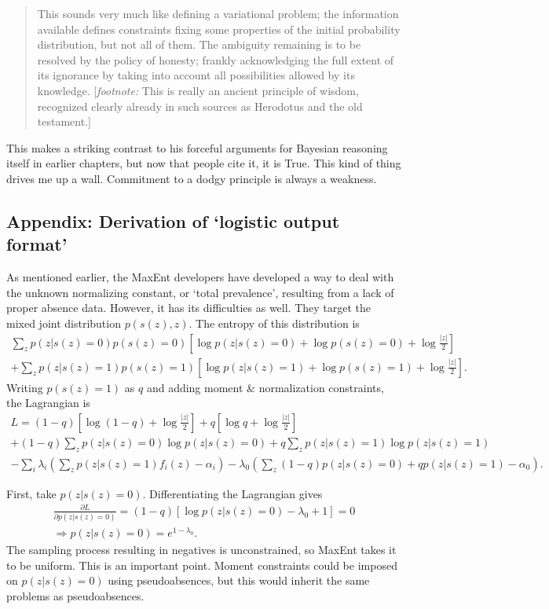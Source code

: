\begin{itemize}
\begin{quote}
    This sounds very much like defining a variational problem; the information available defines constraints fixing some properties of the initial probability distribution, but not all of them. The ambiguity remaining is to be resolved by the policy of honesty; frankly acknowledging the full extent of its ignorance by taking into account all possibilities allowed by its knowledge. [\emph{footnote:} This is really an ancient principle of wisdom, recognized clearly already in such sources as Herodotus and the old testament.]
\end{quote}
This makes a striking contrast to his forceful arguments for Bayesian reasoning itself in earlier chapters, but now that people cite it, it is True. This kind of thing drives me up a wall. Commitment to a dodgy principle is always a weakness.
\end{itemize}

\subsection{Appendix: Derivation of `logistic output format'}

As mentioned earlier, the MaxEnt developers have developed a way to deal with the unknown normalizing constant, or `total prevalence', resulting from a lack of proper absence data. However, it has its difficulties as well. They target the mixed joint distribution $p(s(z),z)$. The entropy of this distribution is
\begin{eqnarray*}
    \sum_z p(z|s(z)=0)p(s(z)=0)\left[\log p(z|s(z)=0) + \log p(s(z)=0) + \log \frac{|z|}{2}\right]\\
    +\sum_z p(z|s(z)=1)p(s(z)=1)\left[\log p(z|s(z)=1) + \log p(s(z)=1) + \log \frac{|z|}{2}\right].
\end{eqnarray*}
Writing $p(s(z)=1)$ as $q$ and adding moment \& normalization constraints, the Lagrangian is
\begin{eqnarray*}
    L=(1-q)\left[\log(1-q)+ \log \frac{|z|}{2}\right] + q\left[\log q+ \log \frac{|z|}{2}\right]\\
    +(1-q)\sum_z p(z|s(z)=0)\log p(z|s(z)=0) + q\sum_z p(z|s(z)=1)\log p(z|s(z)=1)\\
    -\sum_i \lambda_i \left(\sum_z p(z|s(z)=1) f_i(z)-\alpha_i\right) - \lambda_0 \left(\sum_z (1-q)p(z|s(z)=0) + qp(z|s(z)=1) -\alpha_0\right).
\end{eqnarray*}

\bigskip
First, take $p(z|s(z)=0)$. Differentiating the Lagrangian gives
\begin{eqnarray*}
    \frac{\partial L}{\partial p(z|s(z)=0)} = (1-q)\left[\log p(z|s(z)=0)-\lambda_0+1\right]=0\\
    \Rightarrow p(z|s(z)=0)=e^{1-\lambda_0}.
\end{eqnarray*}
The sampling process resulting in negatives is unconstrained, so MaxEnt takes it to be uniform. This is an important point. Moment constraints could be imposed on $p(z|s(z)=0)$ using pseudoabsences, but this would inherit the same problems as pseudoabsences.

